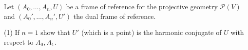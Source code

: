 Let $(A_0, \ldots, A_n, U)$ be a frame of reference for the projective geometry $\mathcal{P}(V)$ and $(A_0', \ldots, A_n', U')$ the dual frame of reference.

(1) If $n = 1$ show that $U'$ (which is a point) is the harmonic conjugate of $U$ with respect to $A_0, A_1$.
